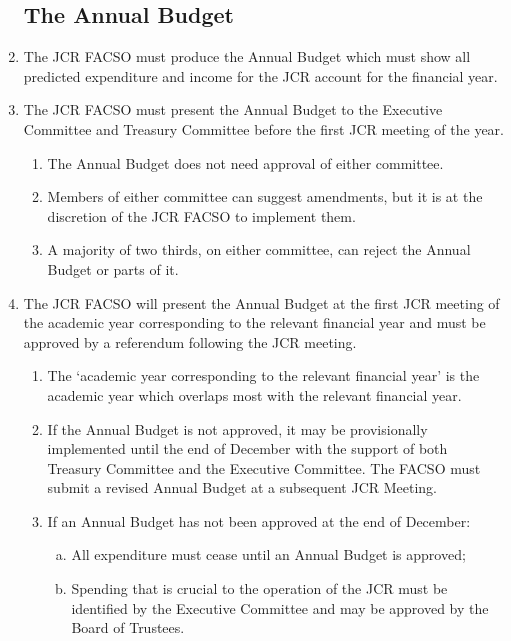 \documentclass[12pt]{article}
\begin{document}
\begin{enumerate}
    \subsection{The Annual Budget}
    \item The JCR FACSO must produce the Annual Budget which must show all predicted expenditure and income for the JCR account for the financial year.
    \item The JCR FACSO must present the Annual Budget to the Executive Committee and Treasury Committee before the first JCR meeting of the year.
    \begin{enumerate}
        \item The Annual Budget does not need approval of either committee.
        \item Members of either committee can suggest amendments, but it is at the discretion of the JCR FACSO to implement them.
        \item A majority of two thirds, on either committee, can reject the Annual Budget or parts of it.
    \end{enumerate}
    \item The JCR FACSO will present the Annual Budget at the first JCR meeting of the academic year corresponding to the relevant financial year and must be approved by a referendum following the JCR meeting.
    \begin{enumerate}
        \item The ‘academic year corresponding to the relevant financial year’ is the academic year which overlaps most with the relevant financial year.
        \item If the Annual Budget is not approved, it may be provisionally implemented until the end of December with the support of both Treasury Committee and the Executive Committee. The FACSO must submit a revised Annual Budget at a subsequent JCR Meeting.
        \item If an Annual Budget has not been approved at the end of December:
        \begin{enumerate}[(a)]
            \item All expenditure must cease until an Annual Budget is approved;
            \item Spending that is crucial to the operation of the JCR must be identified by the Executive Committee and may be approved by the Board of Trustees.
        \end{enumerate}
    \end{enumerate}

\end{enumerate}
\end{document}
